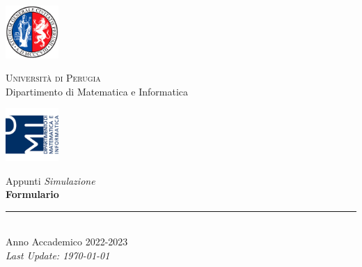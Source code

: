 
\thispagestyle{empty} %

\noindent %
\includegraphics[width=0.15\textwidth]{frontmatter/imgs/logoUniPg.jpg}
\begin{minipage}[b]{0.7\textwidth}
    \centering
    {\Large \textsc{Universit{\`a} di Perugia}}\\
    \vspace{0.4 em}
    {\large Dipartimento di Matematica e Informatica}
    \vspace{0.6 em}
\end{minipage}%
\includegraphics[width=0.15\textwidth]{frontmatter/imgs/logoDMI.jpg}

\vspace{8 em}

\begin{center}
    {\Huge Appunti \textit{Simulazione}}\\
    \vspace{5 em}
    {\Huge \textbf{Formulario}}\\

    \vfill

    \rule{380pt}{.4pt}\\
    \vspace{1.2 em}
    \large{Anno Accademico 2022-2023}\\ %
    \vspace{.9 em}
    \small{\textit{Last Update: \today{}}}
\end{center}

